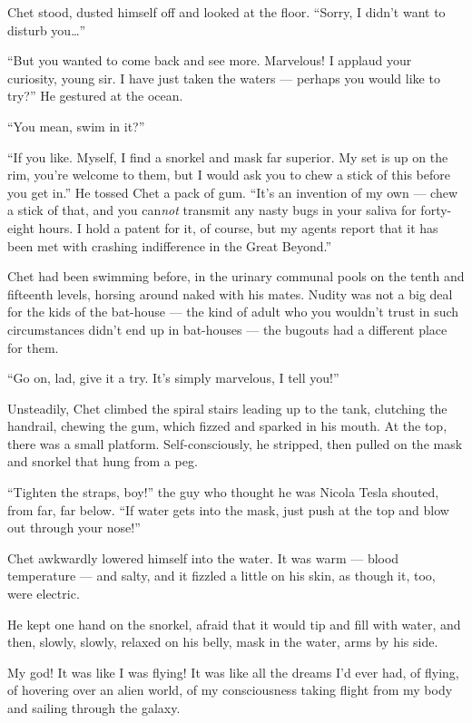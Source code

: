 Chet stood, dusted himself off and looked at the floor.
``Sorry, I didn't want to disturb you\ldots{}''

``But you wanted to come back and see more. Marvelous! I applaud your 
curiosity, young sir. I have just taken the waters --- perhaps you would like 
to try?''
He gestured at the ocean.

``You mean, swim in it?''

``If you like. Myself, I find a snorkel and mask far superior. My set is up on 
the rim, you're welcome to them, but I would ask you to chew a stick of this 
before you get in.''
He tossed Chet a pack of gum.
``It's an invention of my own --- chew a stick of that, and you can\emph{not} 
transmit any nasty bugs in your saliva for forty-eight hours. I hold a patent 
for it, of course, but my agents report that it has been met with crashing 
indifference in the Great Beyond.''

Chet had been swimming before, in the urinary communal pools on the
tenth and fifteenth levels, horsing around naked with his mates.
Nudity was not a big deal for the kids of the bat-house --- the
kind of adult who you wouldn't trust in such circumstances didn't
end up in bat-houses --- the bugouts had a different place for
them.

``Go on, lad, give it a try. It's simply marvelous, I tell you!''

Unsteadily, Chet climbed the spiral stairs leading up to the tank,
clutching the handrail, chewing the gum, which fizzed and sparked
in his mouth. At the top, there was a small platform.
Self-consciously, he stripped, then pulled on the mask and snorkel
that hung from a peg.

``Tighten the straps, boy!'' the guy who thought he was Nicola
Tesla shouted, from far, far below.
``If water gets into the mask, just push at the top and blow out through your 
nose!''

Chet awkwardly lowered himself into the water. It was warm ---
blood temperature --- and salty, and it fizzled a little on his
skin, as though it, too, were electric.

He kept one hand on the snorkel, afraid that it would tip and fill
with water, and then, slowly, slowly, relaxed on his belly, mask in
the water, arms by his side.

My god! It was like I was flying! It was like all the dreams I'd
ever had, of flying, of hovering over an alien world, of my
consciousness taking flight from my body and sailing through the
galaxy.

